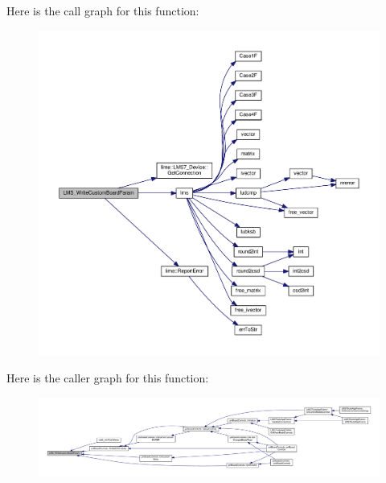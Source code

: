 Here is the call graph for this function\+:
\nopagebreak
\begin{figure}[H]
\begin{center}
\leavevmode
\includegraphics[width=350pt]{df/de1/lms7__api_8cpp_a33751cada624efd567e37df81a57c639_cgraph}
\end{center}
\end{figure}




Here is the caller graph for this function\+:
\nopagebreak
\begin{figure}[H]
\begin{center}
\leavevmode
\includegraphics[width=350pt]{df/de1/lms7__api_8cpp_a33751cada624efd567e37df81a57c639_icgraph}
\end{center}
\end{figure}


